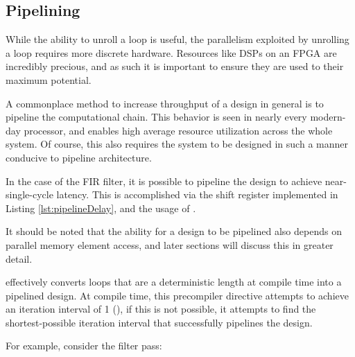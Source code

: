 \documentclass[11pt]{report}
\begin{document}
\begin{quote}
\begin{singlespace}
    
\end{singlespace}
\end{quote}


\subsection{Pipelining}

While the ability to unroll a loop is useful, the parallelism exploited by unrolling a loop requires more discrete hardware. Resources like DSPs on an FPGA are incredibly precious, and as such it is important to ensure they are used to their maximum potential.

A commonplace method to increase throughput of a design in general is to pipeline the computational chain. This behavior is seen in nearly every modern-day processor, and enables high average resource utilization across the whole system. Of course, this also requires the system to be designed in such a manner conducive to pipeline architecture.

In the case of the FIR filter, it is possible to pipeline the design to achieve near-single-cycle latency. This is accomplished via the shift register implemented in Listing \ref{lst:pipelineDelay}, and the usage of . 

It should be noted that the ability for a design to be pipelined also depends on parallel memory element access, and later sections will discuss this in greater detail.

 effectively converts loops that are a deterministic length at compile time into a pipelined design. At compile time, this precompiler directive attempts to achieve an iteration interval of 1 (), if this is not possible, it attempts to find the shortest-possible iteration interval that successfully pipelines the design. 

For example, consider the filter pass:


\begin{quote}
\begin{singlespace}
    
\end{singlespace}
\end{quote}
\end{document}
